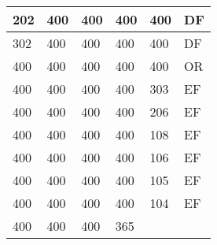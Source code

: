 \begin{table}[]
\begin{tabular}{lllll|l|}
202                                 & 400                                & 400                                & 400                                & 
400                                & DF                                    \\ \hline
302                                 & 400                                & 400                                & 400                                & 
400                                & DF                                    \\ \hline
400                                 & 400                                & 400                                & 400                                & 
400                                & OR                                    \\ \hline
400                                 & 400                                & 400                                & 400                                & 
303                                & EF                                    \\ \hline
400                                 & 400                                & 400                                & 400                                & 
206                                & EF                                    \\ \hline
400                                 & 400                                & 400                                & 400                                & 
108                                & EF                                    \\ \hline
400                                 & 400                                & 400                                & 400                                & 
106                                & EF                                    \\ \hline
400                                 & 400                                & 400                                & 400                                & 
105                                & EF                                    \\ \hline
400                                 & 400                                & 400                                & 400                                & 
104                                & EF                                    \\ \hline
400                                 & 400                                & 400                                & 365                                & 

\end{tabular}
\end{table}
